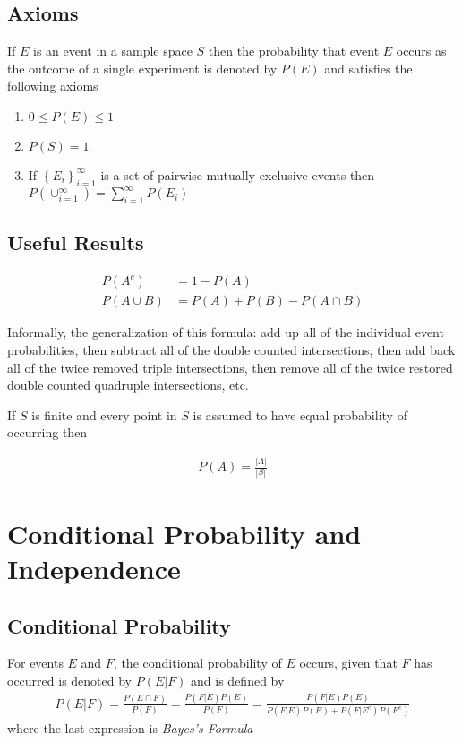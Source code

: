 \documentclass[10pt]{article}
\theoremstyle{definition}
\theoremstyle{theorem}
\begin{document}
		\subsection*{Axioms}
		
		If $E$ is an event in a sample space $S$ then the probability that event $E$ occurs as the outcome of a single experiment is denoted by $P(E)$ and satisfies the following axioms
		
		\begin{enumerate}
			\item $0 \leq P(E) \leq 1$
			\item $P(S)=1$
			\item If $\left\{ E_i \right\}_{i=1}^\infty$ is a set of pairwise mutually exclusive events then $P(\cup_{i=1}^\infty)=\sum_{i=1}^\infty P(E_i)$
		\end{enumerate}
		
		\subsection*{Useful Results}
		
		\begin{align*}
			P(A^c) &= 1 - P(A)\\
			P(A \cup B) &= P(A) + P(B) - P(A \cap B)
		\end{align*}
		
		
		Informally, the generalization of this formula: add up all of the individual event probabilities, then subtract all of the double counted intersections, then add back all of the twice removed triple intersections, then remove all of the twice restored double counted quadruple intersections, etc.
		
		If $S$ is finite and every point in $S$ is assumed to have equal probability of occurring then
		
		\begin{align*}
			 P(A) = \frac{|A|}{|S|}
		\end{align*}
		
		\section{Conditional Probability and Independence}
		
		\subsection*{Conditional Probability}
		
		For events $E$ and $F$, the conditional probability of $E$ occurs, given that $F$ has occurred is denoted by  $P(E|F)$ and is defined by
		\begin{align*}
			P(E|F) 
				= \frac{P(E\cap F)}{P(F)}
				= \frac{P(F|E)P(E)}{P(F)}
				= \frac{P(F|E)P(E)}{P(F|E)P(E)+P(F|E^c)P(E^c)}
		\end{align*}
		where the last expression is \emph{Bayes's Formula}
		
\end{document}
